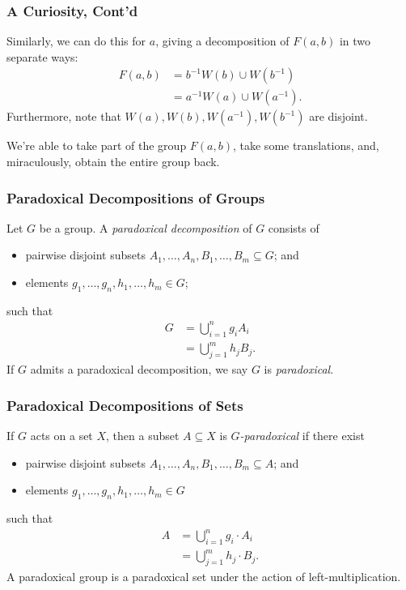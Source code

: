 \documentclass{beamer-custom}
\begin{document}
\begin{frame}
  \frametitle{A Curiosity, Cont'd}
  Similarly, we can do this for $a$, giving a decomposition of $F(a,b)$ in two separate ways:
  \begin{align*}
    F(a,b) &= b^{-1}W(b)\cup W\left( b^{-1} \right)\\
           &= a^{-1}W(a)\cup W\left( a^{-1} \right).
  \end{align*}\pause
  Furthermore, note that $W\left( a \right),W\left( b \right),W\left( a^{-1} \right),W\left( b^{-1} \right)$ are disjoint.\pause\newline

  We're able to take part of the group $F(a,b)$, take some translations, and, miraculously, obtain the entire group back.
\end{frame}
\begin{frame}
  \frametitle{Paradoxical Decompositions of Groups}
  Let $G$ be a group. A \textit{paradoxical decomposition} of $G$ consists of
  \begin{itemize}
    \item pairwise disjoint subsets $A_1,\dots,A_n,B_1,\dots,B_m\subseteq G$; and
    \item elements $g_1,\dots,g_n,h_1,\dots,h_m\in G$;
  \end{itemize}
  such that
  \begin{align*}
    G &= \bigcup_{i=1}^{n}g_iA_i\\
      &= \bigcup_{j=1}^{m}h_jB_j.
  \end{align*}\pause
  If $G$ admits a paradoxical decomposition, we say $G$ is \textit{paradoxical}.
\end{frame}
\begin{frame}
  \frametitle{Paradoxical Decompositions of Sets}
  If $G$ acts on a set $X$, then a subset $A\subseteq X$ is \textit{$G$-paradoxical} if there exist
  \begin{itemize}
    \item pairwise disjoint subsets $A_1,\dots,A_n,B_1,\dots,B_m\subseteq A$; and
    \item elements $g_1,\dots,g_n,h_1,\dots,h_m\in G$
  \end{itemize}
  such that
  \begin{align*}
    A &= \bigcup_{i=1}^{n}g_i\cdot A_i\\
      &= \bigcup_{j=1}^{m}h_j\cdot B_j.
  \end{align*}\pause
  A paradoxical group is a paradoxical set under the action of left-multiplication.
\end{frame}
\end{document}
